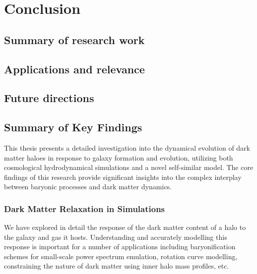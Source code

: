 \chapter{Conclusion}
\label{chap:conclusion}

\section{Summary of research work}

\section{Applications and relevance}

\section{Future directions}


\section*{Summary of Key Findings}

This thesis presents a detailed investigation into the dynamical evolution of dark matter haloes in response to galaxy formation and evolution, utilizing both cosmological hydrodynamical simulations and a novel self-similar model. The core findings of this research provide significant insights into the complex interplay between baryonic processes and dark matter dynamics.

\subsection*{Dark Matter Relaxation in Simulations}
We have explored in detail the response of the dark matter content of a halo to the galaxy and gas it hosts. Understanding and accurately modelling this response is important for a number of applications including baryonification schemes for small-scale power spectrum emulation, rotation curve modelling, %
constraining the nature of dark matter using inner halo mass profiles, etc. 

